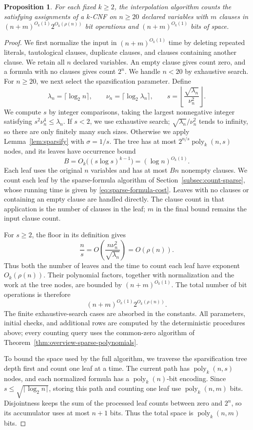 \documentclass[11pt,reqno]{amsart}
\numberwithin{equation}{section}
\newtheorem{proposition}[theorem]{Proposition}
\theoremstyle{definition}\newtheorem{definition}[theorem]{Definition}
\theoremstyle{remark}\newtheorem{remark}[theorem]{Remark}
\newcommand{\poly}{\operatorname{poly}}
\renewcommand{\le}{\leqslant}
\renewcommand{\ge}{\geqslant}
\begin{document}
\begin{proposition}\label{prop:interpolation-bound}
For each fixed $k\ge2$, the interpolation algorithm counts the
satisfying assignments of a $k$-CNF on $n\ge20$ declared variables
with $m$ clauses in $(n+m)^{O_k(1)}2^{O_k(\rho(n))}$ bit operations
and $(n+m)^{O_k(1)}$ bits of space.
\end{proposition}
\begin{proof}
We first normalize the input in $(n+m)^{O_k(1)}$ time by deleting repeated
literals, tautological clauses, duplicate clauses, and clauses
containing another clause. We retain all $n$ declared variables.
An empty clause gives count zero, and a formula with no clauses
gives count $2^n$. We handle $n<20$ by exhaustive search.
For $n\ge20$, we next select the sparsification parameter. Define
\[
 \lambda_n=\lceil\log_2 n\rceil,\qquad
 \nu_n=\lceil\log_2\lambda_n\rceil,\qquad
 s=\left\lfloor\frac{\sqrt{\lambda_n}}{\nu_n^2}\right\rfloor.
\]
We compute $s$ by integer comparisons, taking the largest
nonnegative integer satisfying $s^2\nu_n^4\le\lambda_n$.
If $s<2$, we use exhaustive search;
$\sqrt{\lambda_n}/\nu_n^2$ tends to infinity, so there are only
finitely many such sizes. Otherwise we apply Lemma~\ref{lem:sparsify}
with $\sigma=1/s$. The tree has at most
$2^{n/s}\operatorname{poly}_k(n,s)$ nodes, and its leaves have
occurrence bound
\[
 B=O_k\bigl((s\log s)^{k-1}\bigr)=(\log n)^{O_k(1)}.
\]
Each leaf uses the original $n$ variables and has at most $Bn$
nonempty clauses. We count each leaf by the sparse-formula algorithm
of Section~\ref{subsec:count-sparse}, whose running time is given by
\eqref{eq:sparse-formula-cost}. Leaves with no clauses or containing
an empty clause are handled directly.
The clause count in that application is the number of clauses in
the leaf; $m$ in the final bound remains the input clause count.

For $s\ge2$, the floor in its definition gives
\[
 \frac ns=O\!\left(\frac{n\nu_n^2}{\sqrt{\lambda_n}}\right)
 =O(\rho(n)).
\]
Thus both the number of leaves and the time to count each leaf
have exponent $O_k(\rho(n))$. Their polynomial factors, together
with normalization and the work at the tree nodes, are bounded by
$(n+m)^{O_k(1)}$. The total number of bit operations is therefore
\[
 (n+m)^{O_k(1)}2^{O_k(\rho(n))}.
\]
The finite exhaustive-search cases are absorbed in the constants.
All parameters, initial checks, and additional rows are computed
by the deterministic procedures above; every counting query uses
the common-zero algorithm of Theorem~\ref{thm:overview-sparse-polynomials}.

To bound the space used by the full algorithm, we traverse the
sparsification tree depth first and count one leaf at a time.
The current path has $\poly_k(n,s)$ nodes, and each normalized
formula has a $\poly_k(n)$-bit encoding. Since
$s\le\sqrt{\lceil\log_2 n\rceil}$, storing this path and counting one
leaf use $\poly_k(n,m)$ bits. Disjointness keeps the sum of the
processed leaf counts between zero and $2^n$, so its accumulator
uses at most $n+1$ bits. Thus the total space is $\poly_k(n,m)$ bits.
\end{proof}
\end{document}
